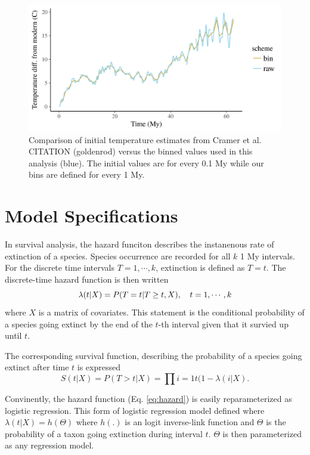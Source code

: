 \documentclass[12pt,letterpaper]{article}
\begin{document}
\begin{figure}[ht]
  \centering
  \includegraphics[width=\textwidth,height=0.5\textheight,keepaspectratio=true]{figure/cramer_temp}
  \caption{Comparison of initial temperature estimates from Cramer et al. CITATION (goldenrod) versus the binned values used in this analysis (blue). The initial values are for every 0.1 My while our bins are defined for every 1 My.}
  \label{fig:temp_curve}
\end{figure}


\section{Model Specifications}

In survival analysis, the hazard funciton describes the instanenous rate of extinction of a species. Species occurrence are recorded for all \(k\) 1 My intervals. For the discrete time intervals \(T = 1, \cdots, k\), extinction is defined as \(T = t\). The discrete-time hazard function is then written 
\begin{equation}
  \lambda(t | X) = P(T = t | T \geq t, X), \quad t = 1, \cdots, k \\
  \label{eq:hazard}
\end{equation}
where \(X\) is a matrix of covariates. This statement is the conditional probability of a species going extinct by the end of the \(t\)-th interval given that it survied up until \(t\).

The corresponding survival function, describing the probability of a species going extinct after time \(t\) is expressed
\begin{equation}
  S(t | X) = P(T > t | X) = \prod{i = 1}{t}(1 - \lambda(i | X).
  \label{eq:surv}
\end{equation}

Convinently, the hazard function (Eq. \ref{eq:hazard}) is easily reparameterized as logistic regression. This form of logistic regression model defined where \(\lambda(t | X) = h(\Theta)\) where \(h(.)\) is an logit inverse-link function and \(\Theta\) is the probability of a taxon going extinction during interval \(t\). \(\Theta\) is then parameterized as any regression model.
\end{document}
